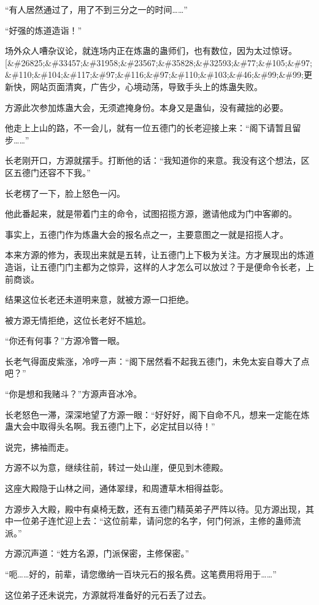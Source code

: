 \begin{this_body}
“有人居然通过了，用了不到三分之一的时间……”

“好强的炼道造诣！”

场外众人嘈杂议论，就连场内正在炼蛊的蛊师们，也有数位，因为太过惊讶。[\&\#26825;\&\#33457;\&\#31958;\&\#23567;\&\#35828;\&\#32593;\&\#77;\&\#105;\&\#97;\&\#110;\&\#104;\&\#117;\&\#97;\&\#116;\&\#97;\&\#110;\&\#103;\&\#46;\&\#99;\&\#99;更新快，网站页面清爽，广告少，心境动荡，导致手头上的炼蛊失败。

方源此次参加炼蛊大会，无须遮掩身份。本身又是蛊仙，没有藏拙的必要。

他走上上山的路，不一会儿，就有一位五德门的长老迎接上来：“阁下请暂且留步……”

长老刚开口，方源就摆手。打断他的话：“我知道你的来意。我没有这个想法，区区五德门还容不下我。”

长老楞了一下，脸上怒色一闪。

他此番起来，就是带着门主的命令，试图招揽方源，邀请他成为门中客卿的。

事实上，五德门作为炼蛊大会的报名点之一，主要意图之一就是招揽人才。

本来方源的修为，表现出来就是五转，让五德门上下极为关注。方才展现出的炼道造诣，让五德门门主都为之惊异，这样的人才怎么可以放过？于是便命令长老，上前商谈。

结果这位长老还未道明来意，就被方源一口拒绝。

被方源无情拒绝，这位长老好不尴尬。

“你还有何事？”方源冷瞥一眼。

长老气得面皮紫涨，冷哼一声：“阁下居然看不起我五德门，未免太妄自尊大了点吧？”

“你是想和我赌斗？”方源声音冰冷。

长老怒色一滞，深深地望了方源一眼：“好好好，阁下自命不凡，想来一定能在炼蛊大会中取得头名啊。我五德门上下，必定拭目以待！”

说完，拂袖而走。

方源不以为意，继续往前，转过一处山崖，便见到木德殿。

这座大殿隐于山林之间，通体翠绿，和周遭草木相得益彰。

方源步入大殿，殿中有桌椅无数，还有五德门精英弟子严阵以待。见方源出现，其中一位弟子连忙迎上去：“这位前辈，请问您的名字，何门何派，主修的蛊师流派。”

方源沉声道：“姓方名源，门派保密，主修保密。”

“呃……好的，前辈，请您缴纳一百块元石的报名费。这笔费用将用于……”

这位弟子还未说完，方源就将准备好的元石丢了过去。


\end{this_body}
